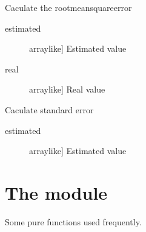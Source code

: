 \documentclass[a4paper,11pt,english]{sphinxmanual}
\begin{document}
\begin{fulllineitems}
\label{\detokenize{model_code:src.model_code.statistics.caculate_rmse}}
\sphinxAtStartPar
Caculate the root\sphinxhyphen{}mean\sphinxhyphen{}square\sphinxhyphen{}error
\begin{description}
\item[{estimated}] \leavevmode{[}array\sphinxhyphen{}like{]}
\sphinxAtStartPar
Estimated value

\item[{real}] \leavevmode{[}array\sphinxhyphen{}like{]}
\sphinxAtStartPar
Real value

\end{description}

\end{fulllineitems}


\begin{fulllineitems}
\label{\detokenize{model_code:src.model_code.statistics.caculate_sde}}
\sphinxAtStartPar
Caculate standard error
\begin{description}
\item[{estimated}] \leavevmode{[}array\sphinxhyphen{}like{]}
\sphinxAtStartPar
Estimated value

\end{description}

\end{fulllineitems}



\section{The  module}
\label{\detokenize{model_code:module-src.model_code.utils}}\label{\detokenize{model_code:the-utils-module}}
\sphinxAtStartPar
Some pure functions used frequently.
\end{document}
